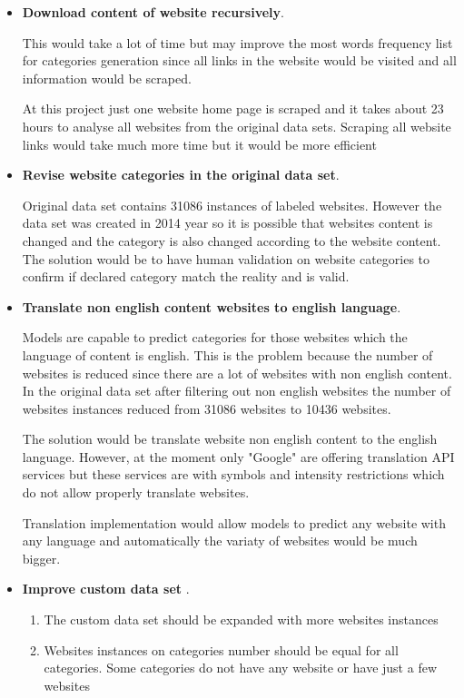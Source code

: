 \begin{itemize}
    \item \textbf{Download content of website recursively}.
    
    This would take a lot of time but may improve the most words frequency list for categories generation since all links in the website would be visited and all information would be scraped. 
    
    At this project just one website home page is scraped and it takes about 23 hours to analyse all websites from the original data sets. Scraping all website links would take much more time but it would be more efficient
    
    \item \textbf{Revise website categories in the original data set}. 
    
    Original data set contains 31086 instances of labeled websites. However the data set was created in 2014 year so it is possible that websites content is changed and the category is also changed according to the website content. The solution would be to have human validation on website categories to confirm if declared category match the reality and is valid.
    
    \item \textbf{Translate non english content websites to english language}.
    
    Models are capable to predict categories for those websites which the language of content is english. This is the problem because the number of websites is reduced since there are a lot of websites with non english content. In the original data set after filtering out non english websites the number of websites instances reduced from 31086 websites to 10436 websites. 
    
    The solution would be translate website non english content to the english language. However, at the moment only "Google" are offering translation API services but these services are with symbols and intensity restrictions which do not allow properly translate websites.
    
    Translation implementation would allow models to predict any website with any language and automatically the variaty of websites would be much bigger.
    
    \item \textbf{Improve custom data set} .
    
    \begin{enumerate}
        \item The custom data set should be expanded with more websites instances
        \item Websites instances on categories number should be equal for all categories. Some categories do not have any website or have just a few websites
    \end{enumerate}
    

\end{itemize}
